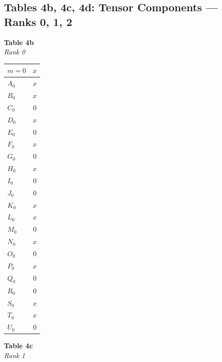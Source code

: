 \documentclass[a4paper,11pt]{article}
\begin{document}
\newpage
\begin{landscape}
\section*{Tables 4b, 4c, 4d: Tensor Components --- Ranks 0, 1, 2}
\label{sec:table4bcd}
\label{sec:table4b}\label{sec:table4c}\label{sec:table4d}
\vspace{2mm}

{\large
\setlength{\tabcolsep}{8pt}
\renewcommand{\arraystretch}{1.30}
\noindent
\begin{minipage}[t]{0.13\textwidth}
\centering
\textbf{Table 4b}\\[2pt]
\textit{Rank 0}\\[4pt]
\begin{tabular}{@{}l c@{}}
\toprule
$m\!=\!0$ & $x$ \\
\midrule
$A_0$ & $x$ \\
$B_0$ & $x$ \\
$C_0$ & $0$ \\
$D_0$ & $x$ \\
$E_0$ & $0$ \\
$F_0$ & $x$ \\
$G_0$ & $0$ \\
$H_0$ & $x$ \\
$I_0$ & $0$ \\
$J_0$ & $0$ \\
$K_0$ & $x$ \\
$L_0$ & $x$ \\
$M_0$ & $0$ \\
$N_0$ & $x$ \\
$O_0$ & $0$ \\
$P_0$ & $x$ \\
$Q_0$ & $0$ \\
$R_0$ & $0$ \\
$S_0$ & $x$ \\
$T_0$ & $x$ \\
$U_0$ & $0$ \\
\bottomrule
\end{tabular}
\end{minipage}%
\hfill
\begin{minipage}[t]{0.22\textwidth}
\centering
\textbf{Table 4c}\\[2pt]
\textit{Rank 1}\\[4pt]
\begin{tabular}{@{}l c c c@{}}

\end{tabular}
\end{minipage}}
\end{landscape}
\end{document}

